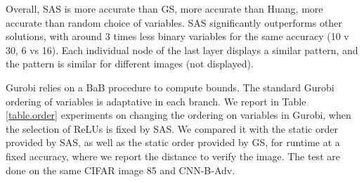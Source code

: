 Overall, SAS is more accurate than GS, more accurate than Huang, more accurate than random choice of variables. SAS significantly outperforms other solutions, 
with around 3 times less binary variables for the same accuracy (10 v 30, 6 vs 16).
Each individual node of the last layer displays a similar pattern, and the pattern is similar for different images (not displayed).


Gurobi relies on a BaB procedure to compute bounds. The standard Gurobi ordering of variables is adaptative in each branch. We report in Table \ref{table.order} experiments on changing the ordering on variables in Gurobi, when the selection of ReLUs is fixed by SAS. We compared it with the static order provided by SAS, as well as the static order provided by GS, for runtime at a fixed accuracy, where we report the distance to verify the image.
The test are done on the same CIFAR image 85  and CNN-B-Adv.





